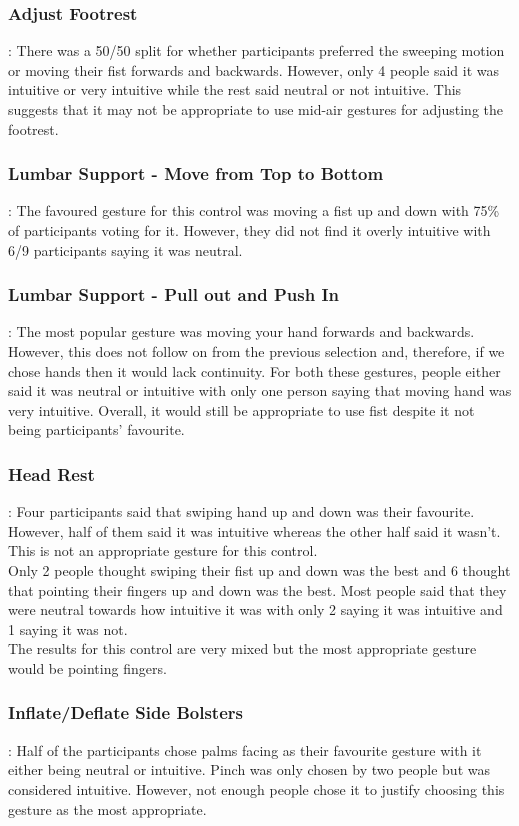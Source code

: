\documentclass{l4proj}
\begin{document}
\subsubsection{Adjust Footrest}: There was a 50/50 split for whether participants preferred the sweeping motion or moving their fist forwards and backwards. However, only 4 people said it was intuitive or very intuitive while the rest said neutral or not intuitive. This suggests that it may not be appropriate to use mid-air gestures for adjusting the footrest.
\subsubsection{Lumbar Support - Move from Top to Bottom}: The favoured gesture for this control was moving a fist up and down with 75\% of participants voting for it. However, they did not find it overly intuitive with 6/9 participants saying it was neutral.
\subsubsection{Lumbar Support - Pull out and Push In}: The most popular gesture was moving your hand forwards and backwards. However, this does not follow on from the previous selection and, therefore, if we chose hands then it would lack continuity. For both these gestures, people either said it was neutral or intuitive with only one person saying that moving hand was very intuitive. Overall, it would still be appropriate to use fist despite it not being participants’ favourite.
\subsubsection{Head Rest}: Four participants said that swiping hand up and down was their favourite. However, half of them said it was intuitive whereas the other half said it wasn't. This is not an appropriate gesture for this control.\\
Only 2 people thought swiping their fist up and down was the best and 6 thought that pointing their fingers up and down was the best. Most people said that they were neutral towards how intuitive it was with only 2 saying it was intuitive and 1 saying it was not.\\
The results for this control are very mixed but the most appropriate gesture would be pointing fingers.
\subsubsection{Inflate/Deflate Side Bolsters}: Half of the participants chose palms facing as their favourite gesture with it either being neutral or intuitive. Pinch was only chosen by two people but was considered intuitive. However, not enough people chose it to justify choosing this gesture as the most appropriate.
\end{document}
